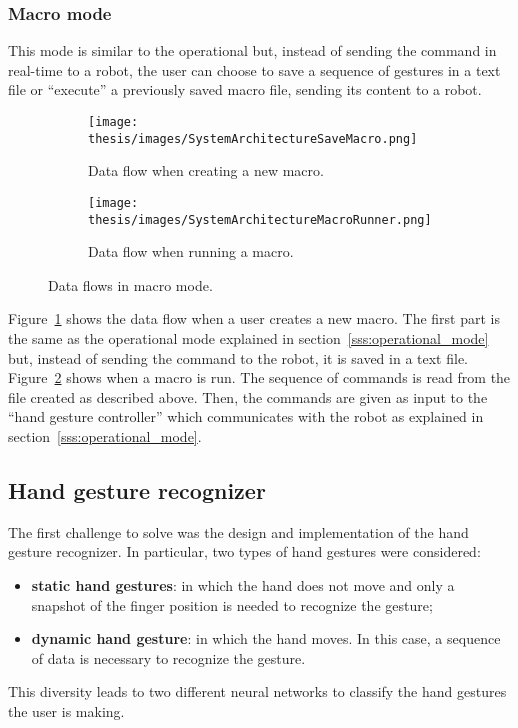 \documentclass[../thesis.tex]{subfiles}
\begin{document}
\subsubsection{Macro mode}
This mode is similar to the operational but, instead of sending the command in real-time to a robot, the user can choose to save a sequence of gestures in a text file or ``execute'' a previously saved macro file, sending its content to a robot. 
\begin{figure}[H]
    \centering
    \begin{subfigure}[b]{\textwidth}
        \texttt{[image: thesis/images/SystemArchitectureSaveMacro.png]}
        \caption{Data flow when creating a new macro.}
        \label{fig:system_architecture_save_macro}
    \end{subfigure}
    \hfill
    \begin{subfigure}[b]{0.7\textwidth}
        \texttt{[image: thesis/images/SystemArchitectureMacroRunner.png]}
        \caption{Data flow when running a macro.}
        \label{fig:system_architecture_run_macro}
    \end{subfigure}
    
    \caption{Data flows in macro mode.}
    \label{fig:macro_data_flows}
\end{figure}
Figure~\ref{fig:system_architecture_save_macro} shows the data flow when a user creates a new macro. The first part is the same as the operational mode explained in section~\ref{sss:operational_mode} but, instead of sending the command to the robot, it is saved in a text file. Figure~\ref{fig:system_architecture_run_macro} shows when a macro is run. The sequence of commands is read from the file created as described above. Then, the commands are given as input to the ``hand gesture controller'' which communicates with the robot as explained in section~\ref{sss:operational_mode}.

\subsection{Hand gesture recognizer}
The first challenge to solve was the design and implementation of the hand gesture recognizer. In particular, two types of hand gestures were considered: 
\begin{itemize}
    \item \textbf{static hand gestures}: in which the hand does not move and only a snapshot of the finger position is needed to recognize the gesture;
    \item \textbf{dynamic hand gesture}: in which the hand moves. In this case, a sequence of data is necessary to recognize the gesture. 
\end{itemize}
This diversity leads to two different neural networks to classify the hand gestures the user is making. 
\end{document}

